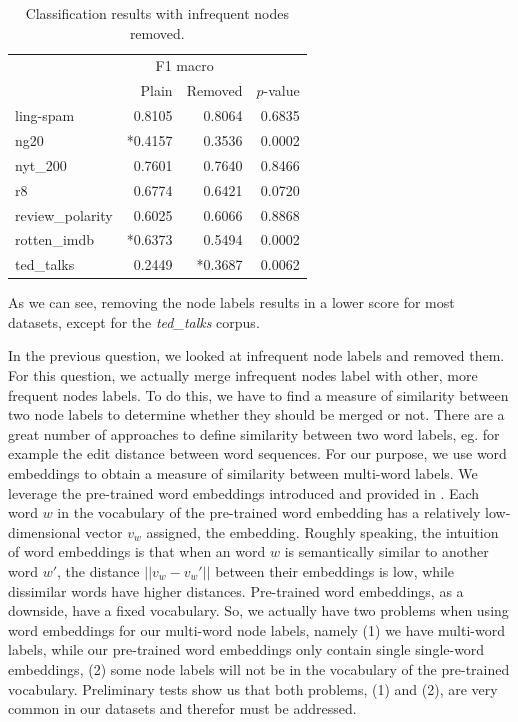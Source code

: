 \begin{table}[htb!]
	\centering
	\begin{tabular}{lrrr}
\toprule
		&  \multicolumn{2}{c}{F1 macro} &  \\
		 &  Plain &  Removed &  $p$-value \\
		\midrule
			ling-spam       & 0.8105 & 0.8064 & 0.6835 \\
			ng20            & *0.4157 & 0.3536 & 0.0002 \\
			nyt\_200         & 0.7601 & 0.7640 & 0.8466 \\
			r8              & 0.6774 & 0.6421 & 0.0720 \\
			review\_polarity & 0.6025 & 0.6066 & 0.8868 \\
			rotten\_imdb     & *0.6373 & 0.5494 & 0.0002 \\
			ted\_talks       & 0.2449 & *0.3687 & 0.0062 \\
		\bottomrule
	\end{tabular}
	\caption[Results: Remove infrequent node labels]{Classification results with infrequent nodes removed.}\label{table:results_infrequent_nodes}
\end{table}

As we can see, removing the node labels results in a lower score for most datasets, except for the \textit{ted\_talks} corpus.


In the previous question, we looked at infrequent node labels and removed them.
For this question, we actually merge infrequent nodes label with other, more frequent nodes labels.
To do this, we have to find a measure of similarity between two node labels to determine whether they should be merged or not.
There are a great number of approaches to define similarity between two word labels, eg. for example the edit distance between word sequences.
For our purpose, we use word embeddings \cite{Mikolov2013,Pennington,Goldberg2014} to obtain a measure of similarity between multi-word labels.
We leverage the pre-trained word embeddings introduced and provided in \cite{Pennington}.
Each word $w$ in the vocabulary of the pre-trained word embedding has a relatively low-dimensional vector $v_w$ assigned, the embedding.
Roughly speaking, the intuition of word embeddings is that when an word $w$ is semantically similar to another word $w'$, the distance $|| v_w - v_w' ||$ between their embeddings is low, while dissimilar words have higher distances.
Pre-trained word embeddings, as a downside, have a fixed vocabulary.
So, we actually have two problems when using word embeddings for our multi-word node labels, namely (1) we have multi-word labels, while our pre-trained word embeddings only contain single single-word embeddings, (2) some node labels will not be in the vocabulary of the pre-trained vocabulary.
Preliminary tests show us that both problems, (1) and (2), are very common in our datasets and therefor must be addressed.

